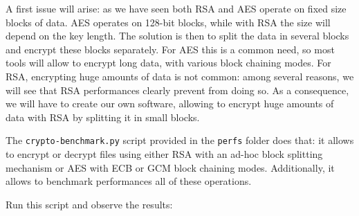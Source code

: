 A first issue will arise: as we have seen both RSA and AES operate on fixed size
blocks of data.
AES operates on 128-bit blocks, while with RSA the size will depend on the key
length.
The solution is then to split the data in several blocks and encrypt these
blocks separately.
For AES this is a common need, so most tools will allow to encrypt long data,
with various block chaining modes.
For RSA, encrypting huge amounts of data is not common: among several reasons,
we will see that RSA performances clearly prevent from doing so.
As a consequence, we will have to create our own software, allowing to encrypt
huge amounts of data with RSA by splitting it in small blocks.

The \texttt{crypto-benchmark.py} script provided in the \texttt{perfs} folder
does that: it allows to encrypt or decrypt files using either RSA with an ad-hoc
block splitting mechanism or AES with ECB or GCM block chaining modes.
Additionally, it allows to benchmark performances all of these operations.

Run this script and observe the results:


